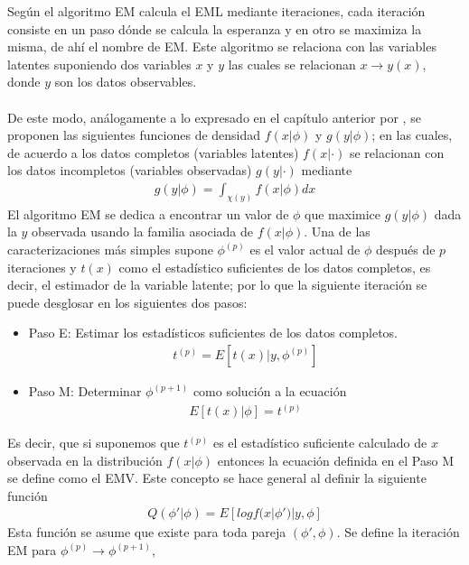 Seg\'un \cite{dempster1977maximum} el algoritmo EM calcula el EML mediante iteraciones, cada iteraci\'on consiste en un paso d\'onde se calcula la esperanza y en otro  se maximiza la misma, de ah\'i el nombre de EM. Este algoritmo se relaciona con las variables latentes suponiendo dos variables $x$ y $y$ las cuales se relacionan $x \to y(x)$, donde $y$ son los datos observables.\\
\\
De este modo, an\'alogamente a lo expresado en el cap\'itulo anterior por \cite{pitt2002constructing}, se proponen las siguientes funciones de densidad $f(x|\phi)$ y $g(y|\phi)$; en las cuales, de acuerdo a \cite{dempster1977maximum} los datos completos (variables latentes) $f(x|\cdot)$ se relacionan con los datos incompletos (variables observadas) $g(y|\cdot)$ mediante
\begin{align*}
g(y|\phi)=\int_{\chi(y)} f(x|\phi)dx
\end{align*}
El algoritmo EM se dedica a encontrar un valor de $\phi$ que maximice $g(y|\phi)$ dada la $y$ observada usando la familia asociada de $f(x|\phi)$. Una de las caracterizaciones m\'as simples supone $\phi^{(p)}$ es el valor actual de $\phi$ despu\'es de $p$ iteraciones y $t(x)$ como el estad\'istico suficientes de los datos completos, es decir, el estimador de la variable latente; por lo que la siguiente iteraci\'on se puede desglosar en los siguientes dos pasos:
\begin{itemize}
\item Paso E: Estimar los estad\'isticos suficientes de los datos completos.
	\begin{align*}
	t^{(p)}=E[t(x)|y,\phi^{(p)}]
	\end{align*}
\item Paso M: Determinar $\phi^{(p+1)}$ como soluci\'on a la ecuaci\'on
	\begin{align*}
	E[t(x)|\phi]=t^{(p)}
	\end{align*}
\end{itemize}
Es decir, que si suponemos que $t^{(p)}$ es el estad\'istico suficiente calculado de $x$ observada en la distribuci\'on $f(x|\phi)$ entonces la ecuaci\'on definida en el Paso M se define como el EMV. Este concepto se hace general al definir la siguiente funci\'on
\begin{align*}
Q(\phi'|\phi)=E[log f(x|\phi')|y,\phi]
\end{align*}
Esta funci\'on se asume que existe para toda pareja $(\phi',\phi)$. Se define la iteraci\'on EM para $\phi^{(p)} \to \phi^{(p+1)}$,
